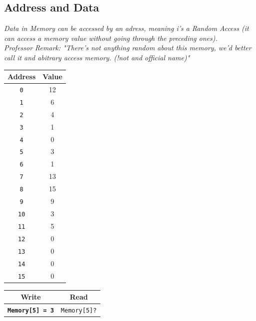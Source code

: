 \subsection{Address and Data}
\textit{Data in Memory can be accessed by an adress, meaning i's a \textit{Random Access} (it can access a memory value without going through the preceding ones).} \\ \vspace*{5px}
\textit{Professor Remark: "There's not anything random about this memory, we'd better call it and abitrary access memory. (!not and official  name)"} \\ \vspace*{5px}
\vspace*{5px}
\begin{minipage}[htp]{0.45\textwidth}
\begin{center}
    \begin{tabular}{|c|c|}
    \hline
    \textbf{Address} & \textbf{Value} \\
    \hline
    \texttt{0} & 12 \\ 
    \hline
    \texttt{1} & 6 \\ 
    \hline
    \texttt{2} & 4 \\ 
    \hline
    \texttt{3} & 1 \\ 
    \hline
    \texttt{4} & 0 \\ 
    \hline
    \texttt{5} & 3 \\ 
    \hline
    \texttt{6} & 1 \\ 
    \hline
    \texttt{7} & 13 \\ 
    \hline
    \texttt{8} & 15 \\ 
    \hline
    \texttt{9} & 9 \\ 
    \hline
    \texttt{10} & 3 \\ 
    \hline
    \texttt{11} & 5 \\ 
    \hline
    \texttt{12} & 0 \\ 
    \hline
    \texttt{13} & 0 \\ 
    \hline
    \texttt{14} & 0 \\ 
    \hline
    \texttt{15} & 0 \\ 
    \hline
    \end{tabular}
\end{center}
\end{minipage}
\hfill
\vline
\hfill
\begin{minipage}[htp]{0.45\textwidth}
\begin{center}
    \begin{tabular}{|c|c|}
    \hline
    \textbf{Write} & \textbf{Read} \\ 
    \hline
    \texttt{\textbf{Memory[5] = 3}} & \texttt{Memory[5]?} \\ 
    \hline
    \end{tabular}
\end{center}
\end{minipage}

